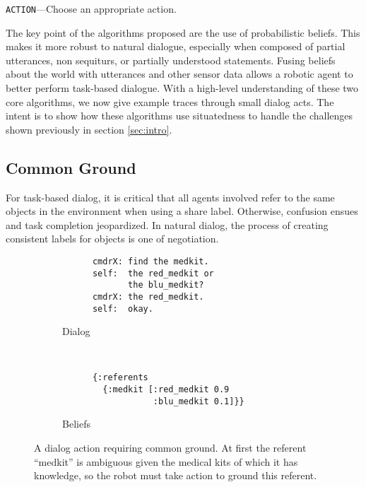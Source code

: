 \documentclass[12pt]{article}
\begin{document}
\begin{algorithm}
  \DontPrintSemicolon
  \caption{ \texttt{ACTION}---Choose an appropriate action.}
  \label{algo:action}
\end{algorithm}

The key point of the algorithms proposed are the use of probabilistic
beliefs. This makes it more robust to natural dialogue, especially
when composed of partial utterances, non sequiturs, or partially
understood statements. Fusing beliefs about the world with utterances
and other sensor data allows a robotic agent to better perform
task-based dialogue. With a high-level understanding of these two core
algorithms, we now give example traces through small dialog acts. The
intent is to show how these algorithms use situatedness to handle the
challenges shown previously in section \ref{sec:intro}.

\subsection{Common Ground}
For task-based dialog, it is critical that all agents involved refer
to the same objects in the environment when using a share
label. Otherwise, confusion ensues and task completion jeopardized. In
natural dialog, the process of creating consistent labels for objects
is one of negotiation. 

\begin{figure}[h]
  \centering
  \begin{subfigure}{0.4\textwidth}
    \centering
\begin{verbatim}
      cmdrX: find the medkit.
      self:  the red_medkit or
             the blu_medkit?
      cmdrX: the red_medkit.
      self:  okay.
\end{verbatim}    
    \label{fig:cg_text}
    \caption{Dialog}
  \end{subfigure}
  ~\quad
  \begin{subfigure}{0.4\textwidth}
    \centering
\begin{verbatim}
      {:referents
        {:medkit [:red_medkit 0.9 
                  :blu_medkit 0.1]}}
\end{verbatim}
    \label{fig:cg_beliefs}
    \caption{Beliefs}
  \end{subfigure}
  \caption{A dialog action requiring common ground. At first the
    referent ``medkit'' is ambiguous given the medical kits of which
    it has knowledge, so the robot must take action to ground this
    referent.}
  \label{fig:cg}
\end{figure}
\end{document}

